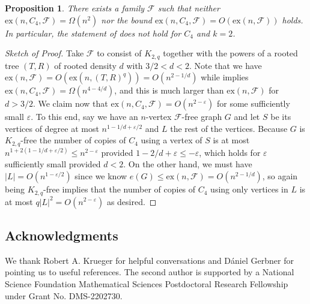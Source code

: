 \documentclass[12pt,letterpaper]{article}
\newtheorem{proposition}[theorem]{Proposition}
\theoremstyle{definition}
\newcommand{\ex}{\mathrm{ex}}
\renewcommand{\c}[1]{\mathcal{#1}}
\newcommand{\Om}{\Omega}
\begin{document}
	\begin{proposition}
		There exists a family $\c{F}$ such that neither $\ex(n,C_4,\c{F})=\Om(n^2)$ nor the bound $\ex(n,C_4,\c{F})=O(\ex(n,\c{F}))$ holds.  In particular, the statement of  does not hold for $C_4$ and $k=2$.
	\end{proposition}
	\begin{proof}[Sketch of Proof]
		Take $\c{F}$ to consist of $K_{2,q}$ together with the powers of a rooted tree $(T,R)$ of rooted density $d$ with $3/2<d<2$.  Note that we have $\ex(n,\c{F})=O(\ex(n,(T,R)^q))=O(n^{2-1/d})$ while  implies $\ex(n,C_4,\c{F})=\Omega(n^{4-4/d})$, and this is much larger than $\ex(n,\c{F})$ for $d>3/2$.  We claim now that $\ex(n,C_4,\c{F})=O(n^{2-\varepsilon})$ for some sufficiently small $\varepsilon$.  To this end, say we have an $n$-vertex $\c{F}$-free graph $G$ and let $S$ be its vertices of degree at most $n^{1-1/d+\varepsilon/2}$ and $L$ the rest of the vertices.  Because $G$ is $K_{2,q}$-free the number of copies of $C_4$ using a vertex of $S$ is at most $n^{1+2(1-1/d+\varepsilon/2)}\le n^{2-\varepsilon}$ provided $1-2/d+\varepsilon\le -\varepsilon$, which holds for $\varepsilon$ sufficiently small provided $d<2$.  On the other hand, we must have $|L|=O(n^{1-\varepsilon/2})$ since we know $e(G)\le \ex(n,\c{F})=O(n^{2-1/d})$, so again being $K_{2,q}$-free implies that the number of copies of $C_4$ using only vertices in $L$ is at most $q|L|^2=O(n^{2-\varepsilon})$ as desired.
	\end{proof}
	
	
	
	\subsection{Acknowledgments}
	We thank Robert A. Krueger for helpful conversations and D\'aniel Gerbner for pointing us to useful references.  The second author is supported by a National Science Foundation Mathematical Sciences Postdoctoral Research Fellowship under Grant No. DMS-2202730.
	
	
	{}
	
\end{document}
